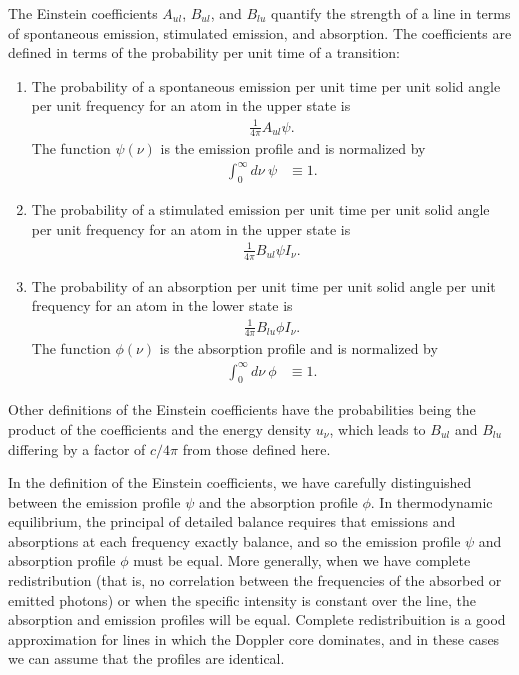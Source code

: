 The Einstein coefficients $A_{ul}$, $B_{ul}$, and $B_{lu}$
quantify the strength of a line in terms of spontaneous
emission, stimulated emission, and absorption. The
coefficients are defined in terms of the probability per
unit time of a transition:
\begin{enumerate}
\item
The probability of a spontaneous emission per unit time per
unit solid angle per unit frequency for an atom in the upper
state is
\begin{align}
\frac{1}{4\pi}A_{ul}\psi.
\end{align}
The function $\psi(\nu)$ is the emission profile
and is normalized by
\begin{align}
\int_0^\infty\!\!\!d\nu\:\psi &\equiv 1.
\end{align}
\item
The probability of a stimulated emission per unit time per
unit solid angle per unit frequency  for
an atom in the upper state is 
\begin{align}
\frac{1}{4\pi}B_{ul}\psi I_\nu.
\end{align}
\item
The probability of an absorption per unit time per
unit solid angle per unit frequency  for an atom
in the lower state is \begin{align}
\frac{1}{4\pi}B_{lu}\phi I_\nu.
\end{align}
The function $\phi(\nu)$ is the absorption profile
and is normalized by
\begin{align}
\int_0^\infty\!\!\!d\nu\:\phi &\equiv 1.
\end{align}
\end{enumerate}
Other definitions of the Einstein coefficients have the
probabilities being the product of the coefficients and the
energy density $u_\nu$, which leads to $B_{ul}$ and $B_{lu}$
differing by a factor of $c/4\pi$ from those defined here.

In the definition of the Einstein coefficients, we have
carefully distinguished between the emission profile
$\psi$ and the absorption profile $\phi$. In
thermodynamic equilibrium, the principal of detailed balance
requires that emissions and absorptions at each frequency
exactly balance, and so the emission profile $\psi$ and
absorption profile $\phi$ must be equal. More generally,
when we have complete redistribution (that is, no
correlation between the frequencies of the absorbed or
emitted photons) or when the specific intensity is constant
over the line, the absorption and emission profiles will be
equal. Complete redistribuition is a good approximation for
lines in which the Doppler core dominates, and in these
cases we can assume that the profiles are identical.

